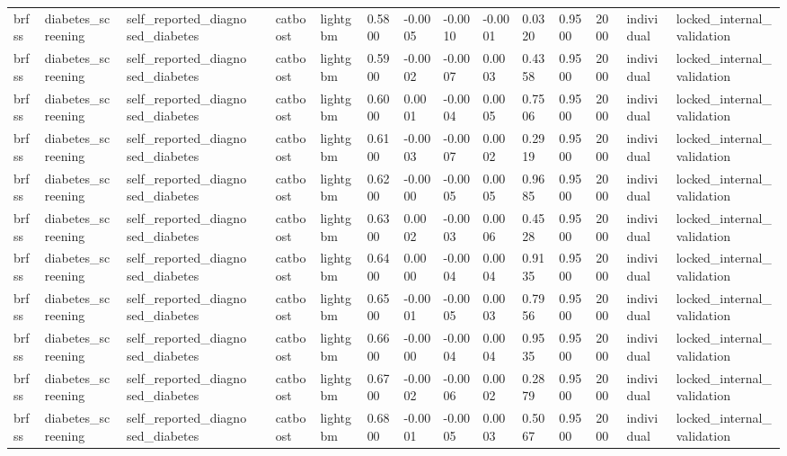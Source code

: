 \begin{tabular}{lllllllllllllll}
brfss & diabetes\_screening & self\_reported\_diagnosed\_diabetes &  & catboost & lightgbm & 0.5800 & -0.0005 & -0.0010 & -0.0001 & 0.0320 & 0.9500 & 2000 & individual & locked\_internal\_validation \\
brfss & diabetes\_screening & self\_reported\_diagnosed\_diabetes &  & catboost & lightgbm & 0.5900 & -0.0002 & -0.0007 & 0.0003 & 0.4358 & 0.9500 & 2000 & individual & locked\_internal\_validation \\
brfss & diabetes\_screening & self\_reported\_diagnosed\_diabetes &  & catboost & lightgbm & 0.6000 & 0.0001 & -0.0004 & 0.0005 & 0.7506 & 0.9500 & 2000 & individual & locked\_internal\_validation \\
brfss & diabetes\_screening & self\_reported\_diagnosed\_diabetes &  & catboost & lightgbm & 0.6100 & -0.0003 & -0.0007 & 0.0002 & 0.2919 & 0.9500 & 2000 & individual & locked\_internal\_validation \\
brfss & diabetes\_screening & self\_reported\_diagnosed\_diabetes &  & catboost & lightgbm & 0.6200 & -0.0000 & -0.0005 & 0.0005 & 0.9685 & 0.9500 & 2000 & individual & locked\_internal\_validation \\
brfss & diabetes\_screening & self\_reported\_diagnosed\_diabetes &  & catboost & lightgbm & 0.6300 & 0.0002 & -0.0003 & 0.0006 & 0.4528 & 0.9500 & 2000 & individual & locked\_internal\_validation \\
brfss & diabetes\_screening & self\_reported\_diagnosed\_diabetes &  & catboost & lightgbm & 0.6400 & 0.0000 & -0.0004 & 0.0004 & 0.9135 & 0.9500 & 2000 & individual & locked\_internal\_validation \\
brfss & diabetes\_screening & self\_reported\_diagnosed\_diabetes &  & catboost & lightgbm & 0.6500 & -0.0001 & -0.0005 & 0.0003 & 0.7956 & 0.9500 & 2000 & individual & locked\_internal\_validation \\
brfss & diabetes\_screening & self\_reported\_diagnosed\_diabetes &  & catboost & lightgbm & 0.6600 & -0.0000 & -0.0004 & 0.0004 & 0.9535 & 0.9500 & 2000 & individual & locked\_internal\_validation \\
brfss & diabetes\_screening & self\_reported\_diagnosed\_diabetes &  & catboost & lightgbm & 0.6700 & -0.0002 & -0.0006 & 0.0002 & 0.2879 & 0.9500 & 2000 & individual & locked\_internal\_validation \\
brfss & diabetes\_screening & self\_reported\_diagnosed\_diabetes &  & catboost & lightgbm & 0.6800 & -0.0001 & -0.0005 & 0.0003 & 0.5067 & 0.9500 & 2000 & individual & locked\_internal\_validation \\

\end{tabular}
